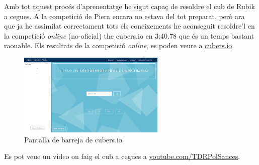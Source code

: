 Amb tot aquest procés d'aprenentatge he sigut capaç de resoldre el cub de Rubik a cegues. A la competició de Piera encara no estava del tot preparat, però ara que ja he assimilat correctament tots els coneixements he aconseguit resoldre'l en la competició \textit{online} (no-oficial) the cubers.io en 3:40.78 que és un temps bastant raonable. Els resultats de la competició \textit{online}, es poden veure a \href{https://www.cubers.io/u/CUBEANDO_CON_POL/}{cubers.io}.

\begin{figure}[!h]
    \centering
    \includegraphics[width=7cm]{img/figures/captura-cubersio.png}
    \caption{Pantalla de barreja de cubers.io}
\end{figure}

Es pot veue un video on faig el cub a cegues a \href{https://www.youtube.com/channel/UCKCx79bCK7JOS4YsgLHbEgA}{youtube.com/TDRPolSances}.
